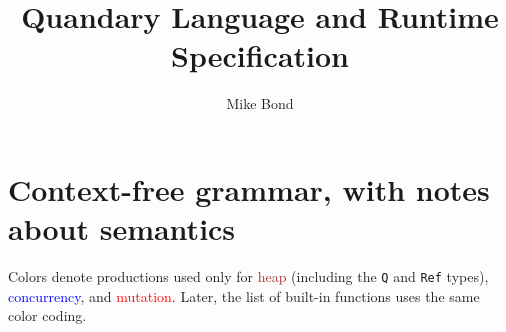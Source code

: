 \documentclass[10pt]{article}
\newcommand{\nt}[1]{\ensuremath{\langle \mathit{#1} \rangle}}
\newcommand{\tm}[1]{\texttt{#1}}
\begin{document}
\title{Quandary Language and Runtime Specification}
\author{Mike Bond}
\maketitle

\newcommand\productions[3]{\nt{#1} ::= \= #2\\#3\smallskip\\}
\newcommand\alt[1]{\> $|$ \' #1 \\}
\newcommand\comment[1]{\` \textcolor{darkgray}{// #1}}

\newcommand\heap[1]{\textcolor{brown}{#1}}
\newcommand\concurrency[1]{\textcolor{blue}{#1}}
\newcommand\mutation[1]{\textcolor{red}{#1}}

\section{Context-free grammar, with notes about semantics}

Colors denote productions used only for
\heap{heap} (including the \tm{Q} and \tm{Ref} types),
\concurrency{concurrency}, and
\mutation{mutation}.
Later, the list of built-in functions uses the same color coding.
\end{document}

